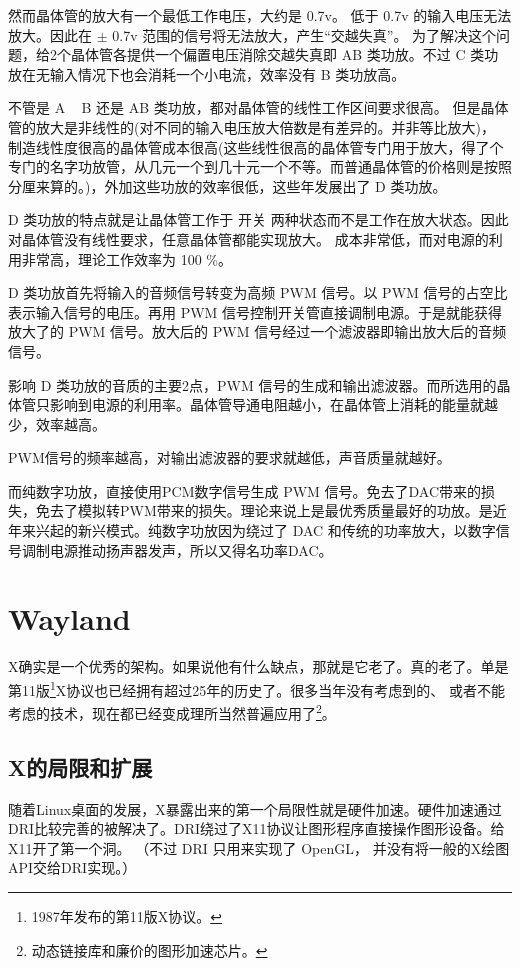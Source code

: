 然而晶体管的放大有一个最低工作电压，大约是 0.7v。 低于 0.7v 的输入电压无法放大。因此在 $\pm$ 0.7v 范围的信号将无法放大，产生“交越失真”。
为了解决这个问题，给2个晶体管各提供一个偏置电压消除交越失真即 AB 类功放。不过 C 类功放在无输入情况下也会消耗一个小电流，效率没有 B 类功放高。

不管是 A ~ B 还是 AB 类功放，都对晶体管的线性工作区间要求很高。
但是晶体管的放大是非线性的(对不同的输入电压放大倍数是有差异的。并非等比放大)， 制造线性度很高的晶体管成本很高(这些线性很高的晶体管专门用于放大，得了个专门的名字功放管，从几元一个到几十元一个不等。而普通晶体管的价格则是按照分厘来算的。)，外加这些功放的效率很低，这些年发展出了 D 类功放。

D 类功放的特点就是让晶体管工作于 开关 两种状态而不是工作在放大状态。因此对晶体管没有线性要求，任意晶体管都能实现放大。
成本非常低，而对电源的利用非常高，理论工作效率为 100 \%。

D 类功放首先将输入的音频信号转变为高频 PWM 信号。以 PWM 信号的占空比表示输入信号的电压。再用 PWM 信号控制开关管直接调制电源。于是就能获得放大了的 PWM 信号。放大后的 PWM 信号经过一个滤波器即输出放大后的音频信号。

影响 D 类功放的音质的主要2点，PWM 信号的生成和输出滤波器。而所选用的晶体管只影响到电源的利用率。晶体管导通电阻越小，在晶体管上消耗的能量就越少，效率越高。

PWM信号的频率越高，对输出滤波器的要求就越低，声音质量就越好。

而纯数字功放，直接使用PCM数字信号生成 PWM 信号。免去了DAC带来的损失，免去了模拟转PWM带来的损失。理论来说上是最优秀质量最好的功放。是近年来兴起的新兴模式。纯数字功放因为绕过了 DAC 和传统的功率放大，以数字信号调制电源推动扬声器发声，所以又得名功率DAC。

\section{Wayland}\label{sec:wayland}

X确实是一个优秀的架构。如果说他有什么缺点，那就是它老了。真的老了。单是第11版\footnote{1987年发布的第11版X协议。}X协议也已经拥有超过25年的历史了。很多当年没有考虑到的、
或者不能考虑的技术，现在都已经变成理所当然普遍应用了\footnote{动态链接库和廉价的图形加速芯片。}。

\subsection{X的局限和扩展}

随着Linux桌面的发展，X暴露出来的第一个局限性就是硬件加速。硬件加速通过DRI比较完善的被解决了。DRI绕过了X11协议让图形程序直接操作图形设备。给X11开了第一个洞。
（不过 DRI 只用来实现了 OpenGL， 并没有将一般的X绘图API交给DRI实现。）

